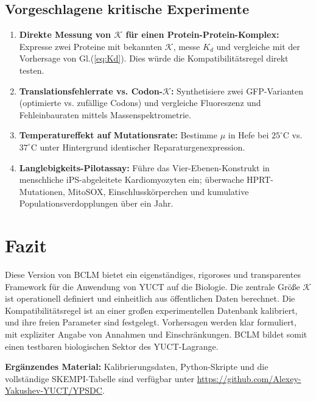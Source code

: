 \documentclass[12pt,a4paper]{article}
\newcommand{\REL}{\mathcal{K}}          %
\begin{document}
	\subsection{Vorgeschlagene kritische Experimente}
	\begin{enumerate}
		\item \textbf{Direkte Messung von \(\REL\) für einen Protein-Protein-Komplex:} Expresse zwei Proteine mit bekannten \(\REL\), messe \(K_d\) und vergleiche mit der Vorhersage von Gl.(\ref{eq:Kd}). Dies würde die Kompatibilitätsregel direkt testen.
		\item \textbf{Translationsfehlerrate vs. Codon-\(\REL\):} Synthetisiere zwei GFP-Varianten (optimierte vs. zufällige Codons) und vergleiche Fluoreszenz und Fehleinbauraten mittels Massenspektrometrie.
		\item \textbf{Temperatureffekt auf Mutationsrate:} Bestimme \(\mu\) in Hefe bei \(25^\circ\text{C}\) vs. \(37^\circ\text{C}\) unter Hintergrund identischer Reparaturgenexpression.
		\item \textbf{Langlebigkeits-Pilotassay:} Führe das Vier-Ebenen-Konstrukt in menschliche iPS-abgeleitete Kardiomyozyten ein; überwache HPRT-Mutationen, MitoSOX, Einschlusskörperchen und kumulative Populationsverdopplungen über ein Jahr.
	\end{enumerate}
	
	\section{Fazit}
	Diese Version von BCLM bietet ein eigenständiges, rigoroses und transparentes Framework für die Anwendung von YUCT auf die Biologie. Die zentrale Größe \(\REL\) ist operationell definiert und einheitlich aus öffentlichen Daten berechnet. Die Kompatibilitätsregel ist an einer großen experimentellen Datenbank kalibriert, und ihre freien Parameter sind festgelegt. Vorhersagen werden klar formuliert, mit expliziter Angabe von Annahmen und Einschränkungen. BCLM bildet somit einen testbaren biologischen Sektor des YUCT-Lagrange.
	
	\vspace{0.5cm}
	\noindent\textbf{Ergänzendes Material:} Kalibrierungsdaten, Python-Skripte und die vollständige SKEMPI-Tabelle sind verfügbar unter \url{https://github.com/Alexey-Yakushev-YUCT/YPSDC}.
	
\end{document}
